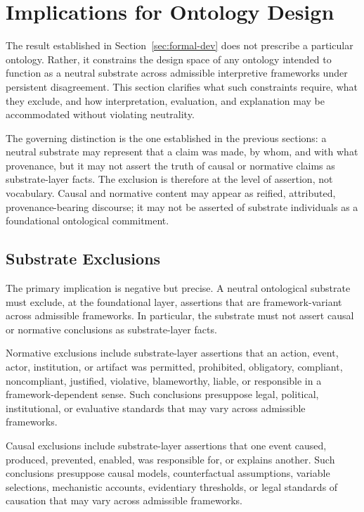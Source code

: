 \section{Implications for Ontology Design}
\label{sec:implications}

The result established in Section~\ref{sec:formal-dev}
does not prescribe a particular ontology.
Rather, it constrains the design space of any ontology
intended to function as a neutral substrate
across admissible interpretive frameworks under persistent disagreement.
This section clarifies what such constraints require,
what they exclude, and
how interpretation, evaluation, and explanation may be accommodated
without violating neutrality.

The governing distinction is the one established in the previous sections:
a neutral substrate may represent that a claim was made,
by whom, and with what provenance,
but it may not assert the truth of
causal or normative claims as substrate-layer facts.
The exclusion is therefore at the level of assertion,
not vocabulary.
Causal and normative content may appear as reified,
attributed, provenance-bearing discourse;
it may not be asserted of substrate individuals
as a foundational ontological commitment.

\subsection{Substrate Exclusions}
\label{sec:substrate-exclusions}

The primary implication is negative but precise.
A neutral ontological substrate must exclude,
at the foundational layer,
assertions that are framework-variant across admissible frameworks.
In particular, the substrate
must not assert causal or normative conclusions as substrate-layer facts.

Normative exclusions include substrate-layer assertions
that an action, event, actor, institution, or artifact
was permitted, prohibited, obligatory, compliant, noncompliant,
justified, violative, blameworthy, liable, or responsible
in a framework-dependent sense.
Such conclusions presuppose legal, political, institutional,
or evaluative standards that may vary across admissible frameworks.

Causal exclusions include substrate-layer assertions
that one event caused, produced, prevented, enabled,
was responsible for, or explains another.
Such conclusions presuppose causal models,
counterfactual assumptions, variable selections,
mechanistic accounts, evidentiary thresholds,
or legal standards of causation that may vary
across admissible frameworks.

